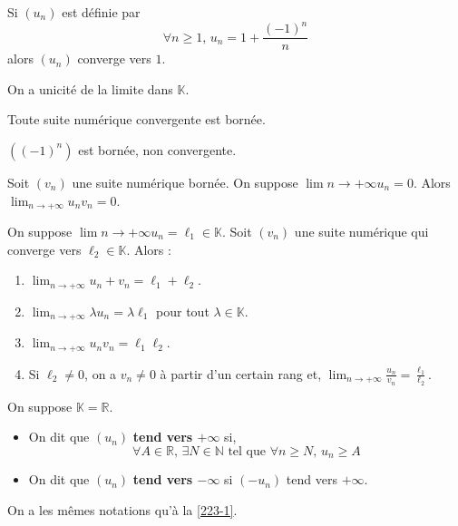 	\begin{example}
		Si $(u_n)$ est définie par
		\[ \forall n \geq 1, \, u_n = 1 + \frac{(-1)^n}{n} \]
		alors $(u_n)$ converge vers $1$.
	\end{example}

	\begin{theorem}
		On a unicité de la limite dans $\mathbb{K}$.
	\end{theorem}

	\begin{proposition}
		Toute suite numérique convergente est bornée.
	\end{proposition}

	\begin{cexample}
		$((-1)^n)$ est bornée, non convergente.
	\end{cexample}

	\begin{proposition}
		Soit $(v_n)$ une suite numérique bornée. On suppose $\lim{n \rightarrow +\infty} u_n = 0$. Alors $\lim_{n \rightarrow +\infty} u_n v_n = 0$.
	\end{proposition}

	\begin{proposition}
		On suppose $\lim{n \rightarrow +\infty} u_n = \ell_1 \in \mathbb{K}$. Soit $(v_n)$ une suite numérique qui converge vers $\ell_2 \in \mathbb{K}$. Alors :
		\begin{enumerate}[label=(\roman*)]
			\item $\lim_{n \rightarrow +\infty} u_n + v_n = \ell_1 + \ell_2$.
			\item $\lim_{n \rightarrow +\infty} \lambda u_n = \lambda \ell_1$ pour tout $\lambda \in \mathbb{K}$.
			\item $\lim_{n \rightarrow +\infty} u_n v_n = \ell_1 \ell_2$.
			\item Si $\ell_2 \neq 0$, on a $v_n \neq 0$ à partir d'un certain rang et, $\lim_{n \rightarrow +\infty} \frac{u_n}{v_n} = \frac{\ell_1}{\ell_2}$.
		\end{enumerate}
	\end{proposition}


	\begin{definition}
		On suppose $\mathbb{K} = \mathbb{R}$.
		\begin{itemize}
			\item On dit que $(u_n)$ \textbf{tend vers $+\infty$} si,
			\[ \forall A \in \mathbb{R}, \, \exists N \in \mathbb{N} \text{ tel que } \forall n \geq N, \, u_n \geq A \]
			\item On dit que $(u_n)$ \textbf{tend vers $-\infty$} si $(-u_n)$ tend vers $+\infty$.
		\end{itemize}
		On a les mêmes notations qu'à la \cref{223-1}.
	\end{definition}


